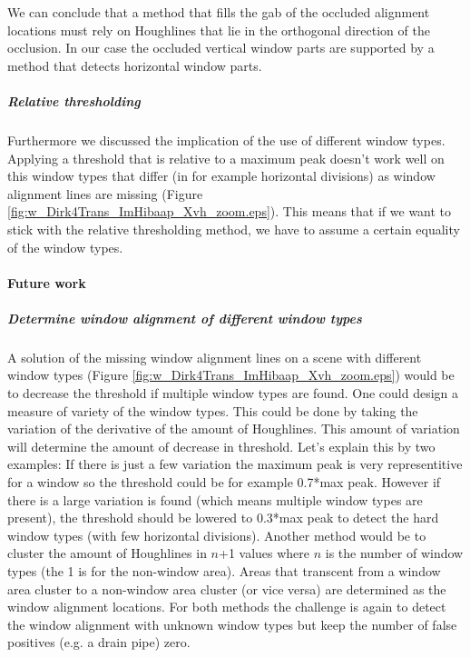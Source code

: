 We can conclude that a method that fills the gab of the occluded alignment locations
must rely on Houghlines that lie in the orthogonal direction of the occlusion.
In our case the occluded vertical window parts are supported by a method that
detects horizontal window parts.

\subparagraph{Relative thresholding}
Furthermore we discussed the implication of the use of different window types.
Applying a threshold that is relative to a maximum peak doesn't work well on
this window types that differ (in for example horizontal divisions) as window
alignment lines are missing (Figure
\ref{fig:w_Dirk4Trans_ImHibaap_Xvh_zoom.eps}).  This means that if we want to
stick with the relative thresholding method, we have to assume a certain
equality of the window types. 




\paragraph{Future work}
\subparagraph{Determine window alignment of different window types}
A solution of the missing window alignment lines on a scene with different
window types (Figure \ref{fig:w_Dirk4Trans_ImHibaap_Xvh_zoom.eps}) would be to
decrease the threshold if multiple window types are found. One could design a
measure of variety of the window types. This could be done by taking the variation of the
derivative of the amount of Houghlines. This amount of variation will determine
the amount of decrease in threshold. Let's explain this by two examples:
If there is just a few variation the maximum peak is very representitive for a
window so the threshold could be for example 0.7*max peak. However if there is a
large variation is found (which means multiple window types are present), the
threshold should be lowered to 0.3*max peak to detect the hard window types
(with few horizontal divisions).
Another method would be to cluster the amount of Houghlines in $n$+1 values
where $n$ is the number of window types (the 1 is for the non-window area).
Areas that transcent from a window area cluster to a non-window area cluster
(or vice versa) are determined as the window alignment locations.
For both methods the challenge is again to detect the window alignment with
unknown window types but keep the number of false positives (e.g. a drain pipe)
zero.

